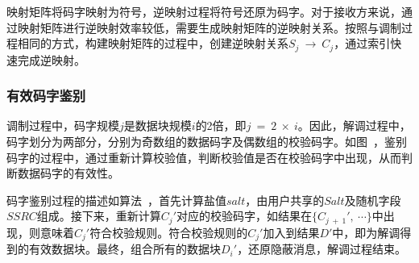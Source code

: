 映射矩阵将码字映射为符号，逆映射过程将符号还原为码字。对于接收方来说，通过映射矩阵进行逆映射效率较低，需要生成映射矩阵的逆映射关系。按照与调制过程相同的方式，构建映射矩阵的过程中，创建逆映射关系$S_{j}\ \rightarrow\ C_{j}$，通过索引快速完成逆映射。

\subsubsection{有效码字鉴别}
\label{chap:zigzag:model:demodulation:identification}


调制过程中，码字规模$j$是数据块规模$i$的2倍，即$j\ =\ 2\ \times\ i$。因此，解调过程中，码字划分为两部分，分别为奇数组的数据码字及偶数组的校验码字。如图\ ，鉴别码字的过程中，通过重新计算校验值，判断校验值是否在校验码字中出现，从而判断数据码字的有效性。

码字鉴别过程的描述如算法\ ，首先计算盐值$salt$，由用户共享的$Salt$及随机字段$SSRC$组成。接下来，重新计算$C_{j}'$对应的校验码字，如结果在$\{C_{j\ +\ 1}',\ \cdots\}$中出现，则意味着$C_{j}'$符合校验规则。符合校验规则的$C_{j}'$加入到结果$D'$中，即为解调得到的有效数据块。最终，组合所有的数据块$D_{i}'$，还原隐蔽消息，解调过程结束。
